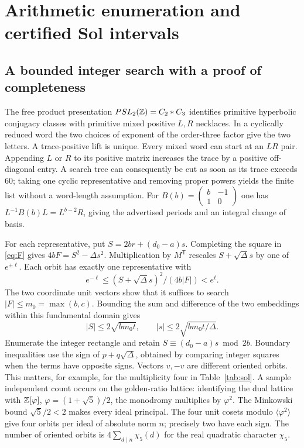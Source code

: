 \section{Arithmetic enumeration and certified Sol intervals}\label{app:enumerate}
\subsection{A bounded integer search with a proof of completeness}
The free product presentation \(PSL_2(\mathbb Z)=C_2*C_3\) identifies primitive hyperbolic conjugacy classes with primitive mixed positive \(L,R\) necklaces. In a cyclically reduced word the two choices of exponent of the order-three factor give the two letters. A trace-positive lift is unique. Every mixed word can start at an \(LR\) pair. Appending \(L\) or \(R\) to its positive matrix increases the trace by a positive off-diagonal entry. A search tree can consequently be cut as soon as its trace exceeds 60; taking one cyclic representative and removing proper powers yields the finite list without a word-length assumption. For \(B(b)=\left(\begin{smallmatrix}b&-1\\1&0\end{smallmatrix}\right)\) one has \(L^{-1}B(b)L=L^{b-2}R\), giving the advertised periods and an integral change of basis.

For each representative, put \(S=2br+(d_0-a)s\). Completing the square in \eqref{eq:F} gives \(4bF=S^2-\Delta s^2\). Multiplication by \(M^\mathsf T\) rescales \(S+\sqrt{\Delta}s\) by one of \(e^{\pm\ell}\). Each orbit has exactly one representative with
\[
 e^{-\ell}\le (S+\sqrt\Delta s)^2/(4b|F|)<e^\ell .
\]
The two coordinate unit vectors show that it suffices to search \(|F|\le m_0=\max(b,c)\). Bounding the sum and difference of the two embeddings within this fundamental domain gives
\[
 |S|\le2\sqrt{bm_0t},\qquad |s|\le2\sqrt{bm_0t/\Delta}.
\]
Enumerate the integer rectangle and retain \(S\equiv(d_0-a)s\bmod 2b\). Boundary inequalities use the sign of \(p+q\sqrt\Delta\), obtained by comparing integer squares when the terms have opposite signs. Vectors \(v,-v\) are different oriented orbits. This matters, for example, for the multiplicity four in Table~\ref{tab:sol}. A sample independent count occurs on the golden-ratio lattice: identifying the dual lattice with \(\mathbb Z[\varphi]\), \(\varphi=(1+\sqrt5)/2\), the monodromy multiplies by \(\varphi^2\). The Minkowski bound \(\sqrt5/2<2\) makes every ideal principal. The four unit cosets modulo \(\langle\varphi^2\rangle\) give four orbits per ideal of absolute norm \(n\); precisely two have each sign. The number of oriented orbits is \(4\sum_{d\mid n}\chi_5(d)\) for the real quadratic character \(\chi_5\).

